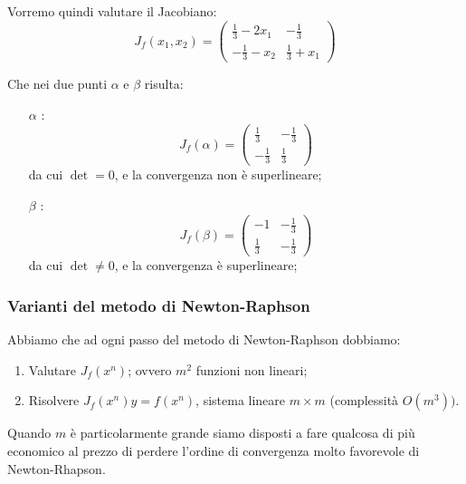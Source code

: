 \documentclass[a4paper,11pt]{article}
\begin{document}
\par\smallskip

Vorremo quindi valutare il Jacobiano:
$$
J_f(x_1, x_2) =
\begin{pmatrix}
	\frac{1}{3} - 2 x_1 & -\frac{1}{3} \\
	-\frac{1}{3} - x_2 & \frac{1}{3} + x_1
\end{pmatrix}
$$

Che nei due punti $\alpha$ e $\beta$ risulta:
\begin{itemize}
	\item[$\alpha$]:
		$$
		J_f(\alpha) =
		\begin{pmatrix}
			\frac{1}{3} & -\frac{1}{3} \\ 
			-\frac{1}{3} & \frac{1}{3}
		\end{pmatrix}
		$$
		da cui $\det = 0$, e la convergenza non è superlineare;
	\item[$\beta$]:
		$$
		J_f(\beta) =
		\begin{pmatrix}
			-1 & -\frac{1}{3} \\ 
			\frac{1}{3} & -\frac{1}{3}
		\end{pmatrix}
		$$
		da cui $\det \neq 0$, e la convergenza è superlineare;
\end{itemize}

\subsubsection{Varianti del metodo di Newton-Raphson}
Abbiamo che ad ogni passo del metodo di Newton-Raphson dobbiamo:
\begin{enumerate}
	\item Valutare $J_f(x^n)$; ovvero $m^2$ funzioni non lineari;
	\item Risolvere $J_f(x^n) y = f(x^n)$, sistema lineare $m \times m$ (complessità $O(m^3))$.
\end{enumerate}

Quando $m$ è particolarmente grande siamo disposti a fare qualcosa di più economico al prezzo di perdere l'ordine di convergenza molto favorevole di Newton-Rhapson.
\end{document}
